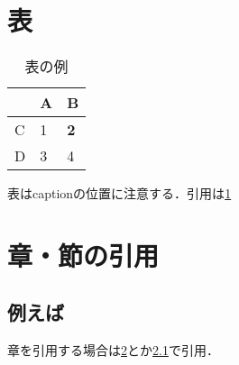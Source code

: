 \documentclass[12pt,a4paper,onecolumn]{jsreport}
\begin{document}
\clearpage
\section{表}
\begin{table}[h]
    \centering
    \caption{表の例}
    \begin{tabular}{|l|l|l|}
    \hline
      & A & B          \\ \hline
    C & 1 & \textbf{2} \\ \hline
    D & 3 & 4          \\ \hline
    \end{tabular}
    \label{tab:表の例}
\end{table}

表はcaptionの位置に注意する．引用は\cref{tab:表の例}

\section{章・節の引用}
\label{sho}
\subsection{例えば}
\label{exam}
章を引用する場合は\cref{sho}とか\cref{exam}で引用．
\end{document}

